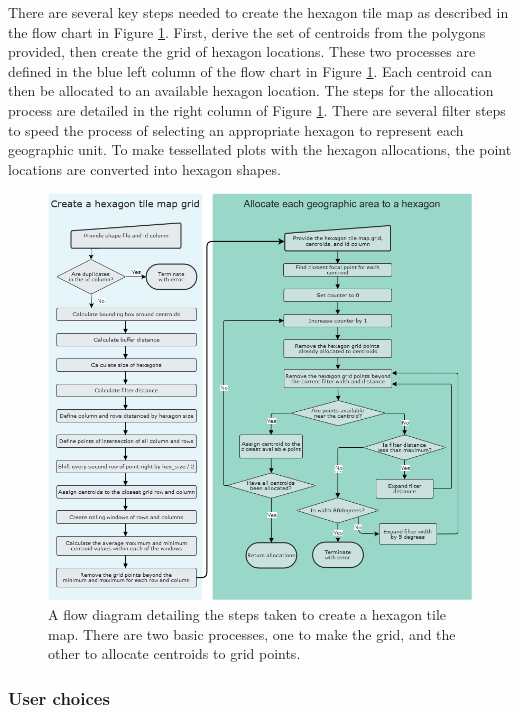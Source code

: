 There are several key steps needed to create the hexagon tile map as
described in the flow chart in Figure \ref{fig:sugarbag_flow}. First,
derive the set of centroids from the polygons provided, then create the
grid of hexagon locations. These two processes are defined in the blue
left column of the flow chart in Figure \ref{fig:sugarbag_flow}. Each
centroid can then be allocated to an available hexagon location. The
steps for the allocation process are detailed in the right column of
Figure \ref{fig:sugarbag_flow}. There are several filter steps to speed
the process of selecting an appropriate hexagon to represent each
geographic unit. To make tessellated plots with the hexagon allocations,
the point locations are converted into hexagon shapes.

\begin{figure}
\includegraphics[width=14cm]{figs/sugarbag flow.png}
\caption{\label{fig:sugarbag_flow}A flow diagram detailing the steps taken to create a hexagon tile map. There are two basic processes, one to make the grid, and the other to allocate centroids to grid points.}
\end{figure}

\hypertarget{user-choices}{%
\subsubsection{User choices}\label{user-choices}}

